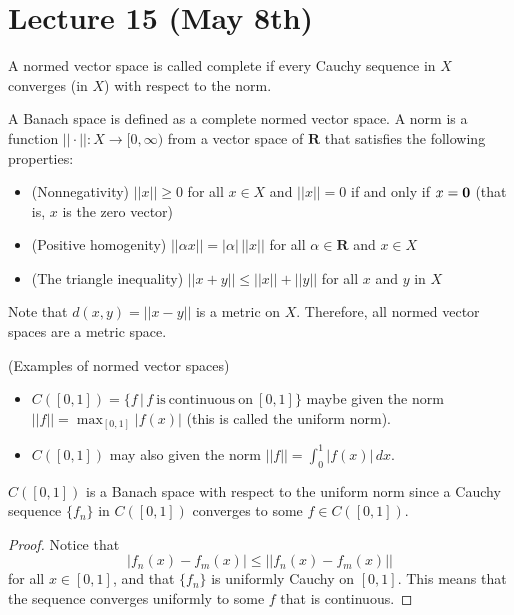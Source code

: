\section{Lecture 15 (May 8th)}
\begin{defi}
A normed vector space is called complete if every Cauchy sequence in $X$ converges (in $X$) with respect to the norm. 
\end{defi}
\vspace{2ex}
\begin{defi}
A Banach space is defined as a complete normed vector space. A norm is a function $||\cdot ||:X\rightarrow [0,\infty )$ from a vector space of ${\bm R}$ that satisfies the following properties:
\begin{itemize}
\item[(i)] (Nonnegativity) $||x||\geq 0$ for all $x\in X$ and $||x||=0$ if and only if $x={\bf 0}$ (that is, $x$ is the zero vector)
\item[(ii)] (Positive homogenity) $||\alpha x||=|\alpha |\,||x||$ for all $\alpha \in {\bm R}$ and $x\in X$
\item[(iii)] (The triangle inequality) $||x+y||\leq ||x||+||y||$ for all $x$ and $y$ in $X$
\end{itemize}
Note that $d(x,y)=||x-y||$ is a metric on $X$. Therefore, all normed vector spaces are a metric space.
\end{defi}
\vspace{2ex}
\begin{ex}
(Examples of normed vector spaces) 
\begin{itemize}
\item[(i)] $C([0,1])=\{f\,|\,f\mathrm{\ is\ continuous\ on\ }[0,1]\}$ maybe given the norm $||f||=\max_{[0,1]}|f(x)|$ (this is called the uniform norm). 
\item[(ii)] $C([0,1])$ may also given the norm $||f||=\int ^{1}_{0}|f(x)|\,dx$.
\end{itemize}
\end{ex}
\vspace{2ex}
\begin{prop}
$C([0,1])$ is a Banach space with respect to the uniform norm since a Cauchy sequence $\{f_{n}\}$ in $C([0,1])$ converges to some $f\in C([0,1])$.
\end{prop}
\vspace{2ex}
\begin{proof}
Notice that
\[|f_{n}(x)-f_{m}(x)|\leq ||f_{n}(x)-f_{m}(x)||\]
for all $x\in [0,1]$, and that $\{f_{n}\}$ is uniformly Cauchy on $[0,1]$. This means that the sequence converges uniformly to some $f$ that is continuous. 
\end{proof}

